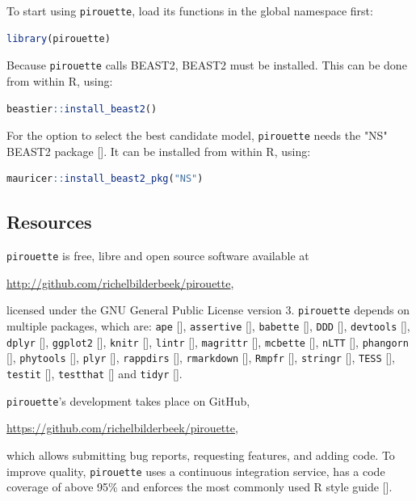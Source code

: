 To start using \verb;pirouette;, 
load its functions in the global namespace first:
\begin{lstlisting}[language=R, floatplacement=ht, frame=single]
library(pirouette)
\end{lstlisting}
Because \verb;pirouette; calls BEAST2, BEAST2 must be installed. 
This can be done from within R, using:
\begin{lstlisting}[language=R, floatplacement=ht, frame=single]
beastier::install_beast2()
\end{lstlisting}
For the option to select the best candidate model,
\verb;pirouette; needs the "NS" BEAST2 package [\cite{russel2019model}].
It can be installed from within R, using:
\begin{lstlisting}[language=R, floatplacement=ht, frame=single]
mauricer::install_beast2_pkg("NS")
\end{lstlisting}

\subsection{Resources}
\label{subsec:resources}

\verb;pirouette; is free, libre and open source software available at 
\begin{sloppypar}
  \url{http://github.com/richelbilderbeek/pirouette},
\end{sloppypar}
licensed under the GNU General Public License version 3.
\verb;pirouette; depends on multiple packages, which are:
\verb;ape; [\cite{ape}],
\verb;assertive; [\cite{assertive}],
\verb;babette; [\cite{bilderbeek2018babette}],
\verb;DDD; [\cite{DDD}],
\verb;devtools; [\cite{devtools}],
\verb;dplyr; [\cite{dplyr}],
\verb;ggplot2; [\cite{ggplot2}],
\verb;knitr; [\cite{knitr}],
\verb;lintr; [\cite{lintr}],
\verb;magrittr; [\cite{magrittr}],
\verb;mcbette; [\cite{mcbette}],
\verb;nLTT; [\cite{nLTT}],
\verb;phangorn; [\cite{phangorn}],
\verb;phytools; [\cite{phytools}],
\verb;plyr; [\cite{plyr}],
\verb;rappdirs; [\cite{rappdirs}],
\verb;rmarkdown; [\cite{rmarkdown}],
\verb;Rmpfr; [\cite{Rmpfr}],
\verb;stringr; [\cite{stringr}],
\verb;TESS; [\cite{TESS}],
\verb;testit; [\cite{testit}], 
\verb;testthat; [\cite{testthat}] and
\verb;tidyr; [\cite{tidyr}].

\verb;pirouette;'s development takes place on GitHub,
\begin{sloppypar}
  \url{https://github.com/richelbilderbeek/pirouette},
\end{sloppypar}
which allows submitting bug reports, requesting features, 
and adding code. To improve quality, \verb;pirouette; 
uses a continuous integration service, has a code coverage of above 95\%
and enforces the most commonly used R style guide [\cite{style_guide}].

